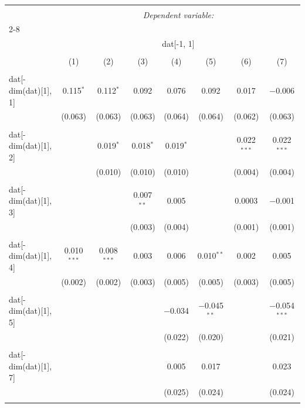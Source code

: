 
\begin{table}[!htbp] \centering 
  \caption{} 
  \label{} 
\begin{tabular}{@{\extracolsep{5pt}}lccccccc} 
\\[-1.8ex]\hline 
\hline \\[-1.8ex] 
 & \multicolumn{7}{c}{\textit{Dependent variable:}} \\ 
\cline{2-8} 
\\[-1.8ex] & \multicolumn{7}{c}{dat[-1, 1]} \\ 
\\[-1.8ex] & (1) & (2) & (3) & (4) & (5) & (6) & (7)\\ 
\hline \\[-1.8ex] 
 dat[-dim(dat)[1], 1] & 0.115$^{*}$ & 0.112$^{*}$ & 0.092 & 0.076 & 0.092 & 0.017 & $-$0.006 \\ 
  & (0.063) & (0.063) & (0.063) & (0.064) & (0.064) & (0.062) & (0.063) \\ 
  & & & & & & & \\ 
 dat[-dim(dat)[1], 2] &  & 0.019$^{*}$ & 0.018$^{*}$ & 0.019$^{*}$ &  & 0.022$^{***}$ & 0.022$^{***}$ \\ 
  &  & (0.010) & (0.010) & (0.010) &  & (0.004) & (0.004) \\ 
  & & & & & & & \\ 
 dat[-dim(dat)[1], 3] &  &  & 0.007$^{**}$ & 0.005 &  & 0.0003 & $-$0.001 \\ 
  &  &  & (0.003) & (0.004) &  & (0.001) & (0.001) \\ 
  & & & & & & & \\ 
 dat[-dim(dat)[1], 4] & 0.010$^{***}$ & 0.008$^{***}$ & 0.003 & 0.006 & 0.010$^{**}$ & 0.002 & 0.005 \\ 
  & (0.002) & (0.002) & (0.003) & (0.005) & (0.005) & (0.003) & (0.005) \\ 
  & & & & & & & \\ 
 dat[-dim(dat)[1], 5] &  &  &  & $-$0.034 & $-$0.045$^{**}$ &  & $-$0.054$^{***}$ \\ 
  &  &  &  & (0.022) & (0.020) &  & (0.021) \\ 
  & & & & & & & \\ 
 dat[-dim(dat)[1], 7] &  &  &  & 0.005 & 0.017 &  & 0.023 \\ 
  &  &  &  & (0.025) & (0.024) &  & (0.024) \\ 
  & & & & & & & \\ 

\end{tabular}
\end{table}
